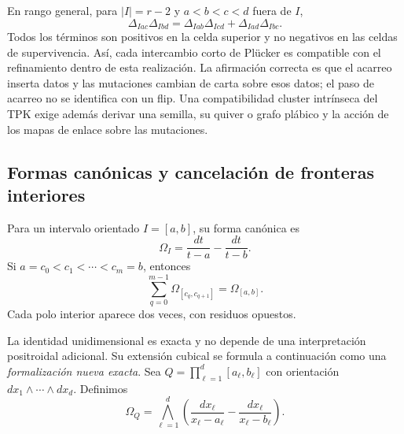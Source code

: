 En rango general, para \(|I|=r-2\) y \(a<b<c<d\) fuera de \(I\),
\begin{equation}
 \Delta_{Iac}\Delta_{Ibd}
 =\Delta_{Iab}\Delta_{Icd}+\Delta_{Iad}\Delta_{Ibc}.
 \label{geometria_positiva:eq:short-plucker-tpk}
\end{equation}
Todos los términos son positivos en la celda superior y no negativos en las
celdas de supervivencia. Así, cada intercambio corto de Plücker es compatible
con el refinamiento dentro de esta realización. La afirmación correcta es que
el acarreo inserta datos y las mutaciones cambian de carta sobre esos datos; el
paso de acarreo no se identifica con un flip. Una compatibilidad cluster
intrínseca del TPK exige además derivar una semilla, su quiver o grafo plábico
y la acción de los mapas de enlace sobre las mutaciones.

\subsection{Formas canónicas y cancelación de fronteras interiores}

Para un intervalo orientado \(I=[a,b]\), su forma canónica es
\begin{equation}
 \Omega_I=\frac{dt}{t-a}-\frac{dt}{t-b}.
 \label{geometria_positiva:eq:interval-canonical-form}
\end{equation}
Si \(a=c_0<c_1<\cdots<c_m=b\), entonces
\begin{equation}
 \sum_{q=0}^{m-1}\Omega_{[c_q,c_{q+1}]}=\Omega_{[a,b]}.
 \label{geometria_positiva:eq:interval-telescopy}
\end{equation}
Cada polo interior aparece dos veces, con residuos opuestos.

La identidad unidimensional es exacta y no depende de una interpretación
positroidal adicional. Su extensión cubical se formula a continuación como una
\emph{formalización nueva exacta}. Sea
\(Q=\prod_{\ell=1}^d[a_\ell,b_\ell]\) con orientación
\(dx_1\wedge\cdots\wedge dx_d\). Definimos
\begin{equation}
 \Omega_Q=\bigwedge_{\ell=1}^d
 \left(\frac{dx_\ell}{x_\ell-a_\ell}
       -\frac{dx_\ell}{x_\ell-b_\ell}\right).
 \label{geometria_positiva:eq:box-canonical-form}
\end{equation}


